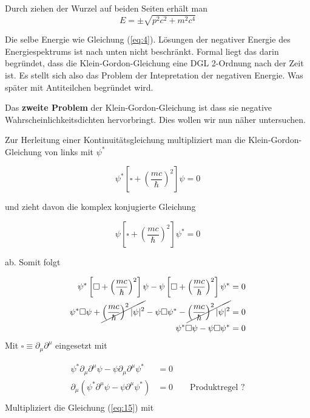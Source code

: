 Durch ziehen der Wurzel auf beiden Seiten erhält man 
\begin{equation}
  \label{eq:11}
  E =\pm \sqrt{ p^2c^2  + m^2c^4 }
\end{equation}

Die selbe Energie wie Gleichung (\ref{eq:4}). Lösungen der negativer Energie des Energiespektrums ist nach unten nicht beschränkt. Formal liegt das darin begründet, dass die Klein-Gordon-Gleichung eine DGL 2-Ordnung nach der Zeit ist. Es stellt sich also das Problem der Intepretation der negativen Energie. Was später mit Antiteilchen begründet wird.

Das \textbf{zweite Problem} der Klein-Gordon-Gleichung ist dass sie negative Wahrscheinlichkeitsdichten hervorbringt. Dies wollen wir nun näher untersuchen.

Zur Herleitung einer Kontinuitätsgleichung multipliziert man die Klein-Gordon-Gleichung von links mit \(\psi^*\)

\begin{equation}
  \label{eq:12}
  \psi^*\left[  \square + \left(\frac{mc}{\hbar}\right)^2\right]\psi  = 0
\end{equation}

und zieht davon die komplex konjugierte Gleichung

\begin{equation}
  \label{eq:13}
  \psi \left[  \square + \left(\frac{mc}{\hbar}\right)^2\right]\psi^*  = 0
\end{equation}

ab. Somit folgt

\begin{align}
  \label{eq:14}
   \psi^*\left[  \square + \left(\frac{mc}{\hbar}\right)^2\right]\psi - \psi \left[  \square + \left(\frac{mc}{\hbar}\right)^2\right]\psi^* &= 0 \\
   \psi^* \square \psi  +  \cancel{\left(\frac{mc}{\hbar}\right)^2 |\psi|^2} - \psi \square\psi^* - \cancel{ \left(\frac{mc}{\hbar}\right)^2|\psi|^2 }  &= 0 \\
   \psi^* \square \psi  - \psi \square\psi^*  &= 0 \\
\end{align}
Mit \(\square \equiv \partial_\mu\partial^\mu \) eingesetzt mit 


\begin{align}
  \label{eq:15}
     \psi^* \partial_\mu\partial^\mu  \psi  - \psi \partial_\mu\partial^\mu\psi^*  &= 0 \\
   \partial_\mu(  \psi^* \partial^\mu  \psi  - \psi \partial^\mu\psi^* ) &= 0 \qquad \text{Produktregel ?}\\
\end{align}
Multipliziert die Gleichung (\ref{eq:15}) mit


